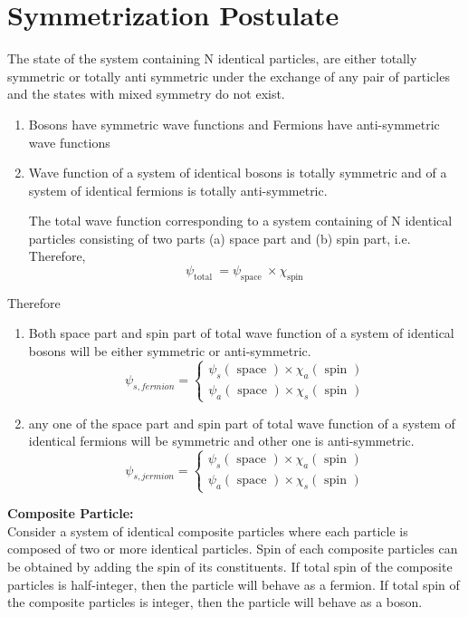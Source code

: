 \section{Symmetrization Postulate}
The state of the system containing $\mathrm{N}$ identical particles, are either totally symmetric or totally anti symmetric under the exchange of any pair of particles and the states with mixed symmetry do not exist.
\begin{note}
	\begin{enumerate}[label=\roman*)]
		\item  Bosons have symmetric wave functions and Fermions have anti-symmetric wave functions
		\item Wave function of a system of identical bosons is totally symmetric and of a system of identical fermions is totally anti-symmetric.
		
		The total wave function corresponding to a system containing of $\mathrm{N}$ identical particles consisting of two parts (a) space part and (b) spin part, i.e.
		Therefore,
		$$
		\psi_{\text {total }}=\psi_{\text {space }} \times \chi_{\text {spin }}
		$$
	\end{enumerate}
	Therefore
	\begin{enumerate}[label=\roman*)]
		\item Both space part and spin part of total wave function of a system of identical bosons will be either symmetric or anti-symmetric.
		$$
		\psi_{s, f e r m i o n}=\left\{\begin{array}{l}
		\psi_{s}(\text { space }) \times \chi_{a}(\text { spin }) \\
		\psi_{a}(\text { space }) \times \chi_{s}(\text { spin })
		\end{array}\right.
		$$
		\item any one of the space part and spin part of total wave function of a system of identical fermions will be symmetric and other one is anti-symmetric.
		$$
		\psi_{s, j e r m i o n}=\left\{\begin{array}{l}
		\psi_{s}(\text { space }) \times \chi_{a}(\text { spin }) \\
		\psi_{a}(\text { space }) \times \chi_{s}(\text { spin })
		\end{array}\right.
		$$
	\end{enumerate}
	\end{note}
	\textbf{Composite Particle:}\\
Consider a system of identical composite particles where each particle is composed of two or more identical particles. Spin of each composite particles can be obtained by adding the spin of its constituents. If total spin of the composite particles is half-integer, then the particle will behave as a fermion. If total spin of the composite particles is integer, then the particle will behave as a boson.\\

